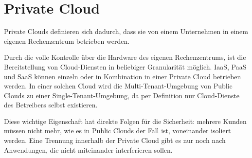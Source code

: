 \documentclass[../main.tex]{subfiles}
\begin{document}



  \section{Private Cloud}
  \label{privateCloud}
    Private Clouds definieren sich dadurch, dass sie von einem Unternehmen in einem eigenen Rechenzentrum betrieben werden.

    Durch die volle Kontrolle über die Hardware des eigenen Rechenzentrums, ist die Bereitstellung von Cloud-Diensten in beliebiger Granularität möglich. IaaS, PaaS und SaaS können einzeln oder in Kombination in einer Private Cloud betrieben werden. In einer solchen Cloud wird die Multi-Tenant-Umgebung von Public Clouds zu einer Single-Tenant-Umgebung, da per Definition nur Cloud-Dienste des Betreibers selbst existieren.

    Diese wichtige Eigenschaft hat direkte Folgen für die Sicherheit:
    mehrere Kunden müssen nicht mehr, wie es in Public Clouds der Fall ist, voneinander isoliert werden. Eine Trennung innerhalb der Private Cloud gibt es nur noch nach Anwendungen, die nicht miteinander interferieren sollen.
\end{document}
